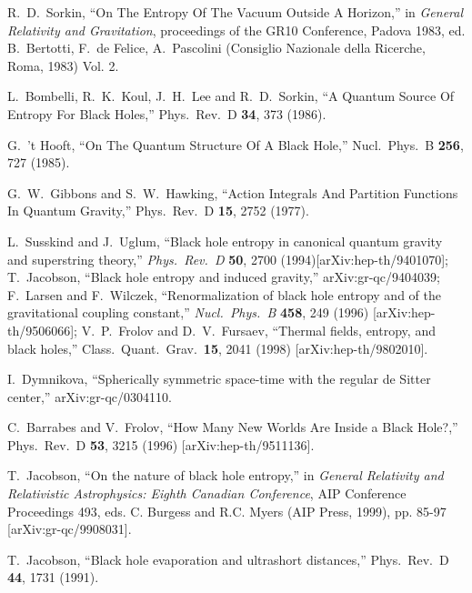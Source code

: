 \documentclass[12pt]{article}
\begin{document}
\begin{thebibliography}{99}
R.~D.~Sorkin,
``On The Entropy Of The Vacuum Outside A Horizon,''
in {\it General Relativity and Gravitation},
proceedings of the GR10 Conference, Padova 1983, ed. B.~Bertotti,
F.~de Felice, A.~Pascolini (Consiglio Nazionale della Ricerche,
Roma, 1983) Vol. 2.

L.~Bombelli, R.~K.~Koul, J.~H.~Lee and R.~D.~Sorkin,
``A Quantum Source Of Entropy For Black Holes,''
Phys.\ Rev.\ D {\bf 34}, 373 (1986).

G.~'t Hooft,
``On The Quantum Structure Of A Black Hole,''
Nucl.\ Phys.\ B {\bf 256}, 727 (1985).

G.~W.~Gibbons and S.~W.~Hawking,
``Action Integrals And Partition Functions In Quantum Gravity,''
Phys.\ Rev.\ D {\bf 15}, 2752 (1977).

L.~Susskind and J.~Uglum,
``Black hole entropy in canonical quantum gravity and superstring theory,''
{\it Phys.\ Rev.\ D} {\bf 50}, 2700 (1994)[arXiv:hep-th/9401070];
T.~Jacobson,
``Black hole entropy and induced gravity,''
arXiv:gr-qc/9404039; F.~Larsen and F.~Wilczek,
``Renormalization of black hole entropy and 
of the gravitational coupling constant,''
{\it Nucl.\ Phys.\ B} {\bf 458}, 249 (1996) [arXiv:hep-th/9506066];
V.~P.~Frolov and D.~V.~Fursaev,
``Thermal fields, entropy, and black holes,''
Class.\ Quant.\ Grav.\  {\bf 15}, 2041 (1998)
[arXiv:hep-th/9802010].

I.~Dymnikova,
``Spherically symmetric space-time with the regular de Sitter center,''
arXiv:gr-qc/0304110.

C.~Barrabes and V.~Frolov,
``How Many New Worlds Are Inside a Black Hole?,''
Phys.\ Rev.\ D {\bf 53}, 3215 (1996)
[arXiv:hep-th/9511136].

T.~Jacobson,
``On the nature of black hole entropy,''
in {\it General Relativity and Relativistic Astrophysics: Eighth Canadian
Conference}, AIP Conference Proceedings 493,
eds. C. Burgess and R.C. Myers (AIP Press, 1999), pp. 85-97
[arXiv:gr-qc/9908031].

T.~Jacobson,
``Black hole evaporation and ultrashort distances,''
Phys.\ Rev.\ D {\bf 44}, 1731 (1991).


\end{thebibliography}
\end{document}
